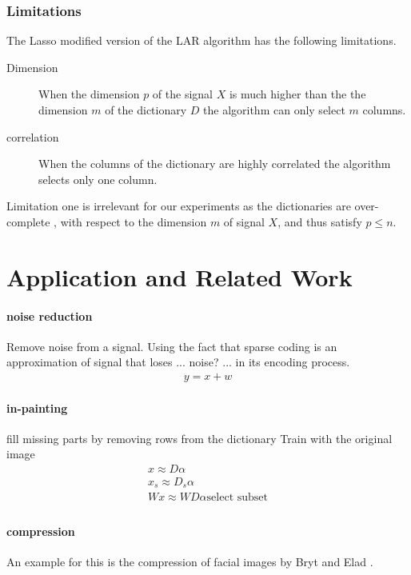 \subsubsection*{Limitations}
The Lasso modified version of the LAR algorithm has the following limitations.
\begin{description}
 \item[Dimension] When the dimension $p$ of the signal $X$ is 
much higher than the the dimension $m$ of the dictionary $D$ the algorithm can only select $m$ columns.

\item[correlation] When the columns of the dictionary are highly correlated the algorithm
selects only one column.
\end{description}

Limitation one is irrelevant for our experiments as the dictionaries are over-complete 
, with respect to the dimension $m$ of signal $X$, and thus satisfy $p\leq n$.

\section{Application and Related Work}

\paragraph{noise reduction}
Remove noise from a signal. 
Using the fact that sparse coding is an approximation of signal that loses ... noise? ... in its encoding process. 
\begin{align*}
y = x + w
\end{align*}

\cite{Elad2006}


\paragraph{in-painting}
fill missing parts by removing rows from the dictionary
Train with the original image
\begin{align*}
x \approx D\alpha\\
x_s \approx D_s\alpha\\
Wx \approx WD\alpha\text{select subset}\\
\end{align*}

\cite{mairal08sparse}

\paragraph{compression} \cite{Murray2006} \cite{Lewicki1999} An example for this is the compression of facial images by Bryt and Elad \cite{Bryt2008}.

